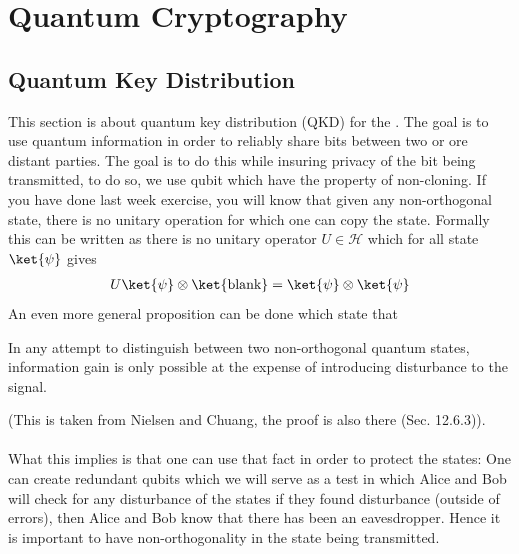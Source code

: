 \chapter{Quantum Cryptography}%
\label{cha:Quantum Cryptography}

\section{Quantum Key Distribution}

This section is about quantum key distribution (QKD) for the . The goal is to use quantum information in order to reliably share bits between two or ore distant parties. The goal is to do this while insuring privacy of the bit being transmitted, to do so, we use qubit which have the property of non-cloning. If you have done last week exercise, you will know that given any non-orthogonal state, there is no unitary operation for which one can copy the state. Formally this can be written as there is no unitary operator $U \in \mathcal{H}$ which for all state $\ket{\psi}$ gives 
\begin{align*} 
	U \ket{\psi} \otimes \ket{\text{blank}}  = \ket{\psi} \otimes \ket{\psi}
\end{align*}
An even more general proposition can be done which state that  
\begin{center}
    In any attempt to distinguish between two non-orthogonal quantum states, information gain is only possible at the expense of introducing disturbance to the signal.
\end{center}
(This is taken from Nielsen and Chuang, the proof is also there (Sec. 12.6.3)).\\
$ $\\
What this implies is that one can use that fact in order to protect the states: One can create redundant qubits which we will serve as a test in which Alice and Bob will check for any disturbance of the states if they found disturbance (outside of errors), then Alice and Bob know that there has been an eavesdropper. Hence it is important to have non-orthogonality in the state being transmitted.


